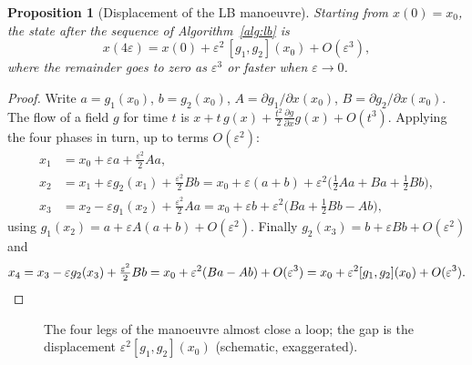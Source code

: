 \documentclass[11pt,a4paper]{article}
\newcommand{\LB}[2]{[#1,#2]}
\theoremstyle{plain}
\newtheorem{proposition}[theorem]{Proposition}
\theoremstyle{definition}
\theoremstyle{remark}
\begin{document}
\begin{proposition}[Displacement of the LB manoeuvre]
\label{prop:lbdisp}
Starting from $x(0)=x_0$, the state after the sequence of Algorithm~\ref{alg:lb} is
\[
x(4\varepsilon)=x(0)+\varepsilon^2\,\LB{g_1}{g_2}(x_0)+O(\varepsilon^3),
\]
where the remainder goes to zero as $\varepsilon^3$ or faster when $\varepsilon\to0$.
\end{proposition}
\begin{proof}
Write $a=g_1(x_0)$, $b=g_2(x_0)$, $A=\partial g_1/\partial x(x_0)$, $B=\partial g_2/\partial x(x_0)$. The flow of a field $g$ for time $t$ is $x+t\,g(x)+\tfrac{t^2}{2}\tfrac{\partial g}{\partial x}g(x)+O(t^3)$. Applying the four phases in turn, up to terms $O(\varepsilon^2)$:
\begin{align*}
x_1&=x_0+\varepsilon a+\tfrac{\varepsilon^2}{2}Aa,\\
x_2&=x_1+\varepsilon g_2(x_1)+\tfrac{\varepsilon^2}2Bb=x_0+\varepsilon(a+b)+\varepsilon^2\big(\tfrac12Aa+Ba+\tfrac12Bb\big),\\
x_3&=x_2-\varepsilon g_1(x_2)+\tfrac{\varepsilon^2}2Aa=x_0+\varepsilon b+\varepsilon^2\big(Ba+\tfrac12Bb-Ab\big),
\end{align*}
using $g_1(x_2)=a+\varepsilon A(a+b)+O(\varepsilon^2)$. Finally $g_2(x_3)=b+\varepsilon Bb+O(\varepsilon^2)$ and
\[
x_4=x_3-\varepsilon g_2(x_3)+\tfrac{\varepsilon^2}2Bb=x_0+\varepsilon^2(Ba-Ab)+O(\varepsilon^3)
=x_0+\varepsilon^2\LB{g_1}{g_2}(x_0)+O(\varepsilon^3).\qedhere
\]
\end{proof}

\begin{figure}[H]
\centering
{}
\caption{The four legs of the manoeuvre almost close a loop; the gap is the displacement $\varepsilon^2\LB{g_1}{g_2}(x_0)$ (schematic, exaggerated).}
\label{fig:lbloop}
\end{figure}
\end{document}
